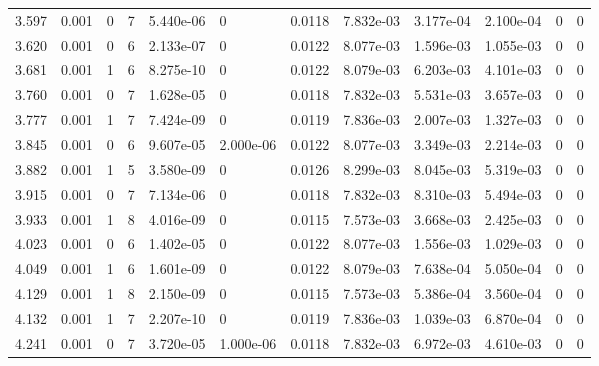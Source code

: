 \documentclass[preview]{standalone}
\begin{document}
{{{\begin{tabular}{L{1.2cm}C{1.2cm} C{0.3cm}C{0.5cm} C{1.4cm}C{1.4cm} C{1.4cm}C{1.4cm} C{1.6cm}C{1.6cm} C{1.6cm}C{1.6cm}}
  3.597  &  0.001  & 0     &  7 &  5.440e-06  & 0  &  0.0118&   7.832e-03& 3.177e-04 & 2.100e-04   &  0 & 0  \\ 
  3.620  &  0.001  & 0     &  6 &  2.133e-07  & 0  &  0.0122&   8.077e-03& 1.596e-03 & 1.055e-03   &  0 & 0  \\ 
  3.681  &  0.001  & 1     &  6 &  8.275e-10  & 0  &  0.0122&   8.079e-03& 6.203e-03 & 4.101e-03   &  0 & 0  \\ 
  3.760  &  0.001  & 0     &  7 &  1.628e-05  & 0  &  0.0118&   7.832e-03& 5.531e-03 & 3.657e-03   &  0 & 0  \\ 
  3.777  &  0.001  & 1     &  7 &  7.424e-09  & 0  &  0.0119&   7.836e-03& 2.007e-03 & 1.327e-03   &  0 & 0  \\ 
  3.845  &  0.001  & 0     &  6 &  9.607e-05  & 2.000e-06  &  0.0122&   8.077e-03& 3.349e-03 & 2.214e-03   &  0 & 0  \\ 
  3.882  &  0.001  & 1     &  5 &  3.580e-09  & 0  &  0.0126&   8.299e-03& 8.045e-03 & 5.319e-03   &  0 & 0  \\ 
  3.915  &  0.001  & 0     &  7 &  7.134e-06  & 0  &  0.0118&   7.832e-03& 8.310e-03 & 5.494e-03   &  0 & 0  \\ 
  3.933  &  0.001  & 1     &  8 &  4.016e-09  & 0  &  0.0115&   7.573e-03& 3.668e-03 & 2.425e-03   &  0 & 0  \\ 
  4.023  &  0.001  & 0     &  6 &  1.402e-05  & 0  &  0.0122&   8.077e-03& 1.556e-03 & 1.029e-03   &  0 & 0  \\ 
  4.049  &  0.001  & 1     &  6 &  1.601e-09  & 0  &  0.0122&   8.079e-03& 7.638e-04 & 5.050e-04   &  0 & 0  \\ 
  4.129  &  0.001  & 1     &  8 &  2.150e-09  & 0  &  0.0115&   7.573e-03& 5.386e-04 & 3.560e-04   &  0 & 0  \\ 
  4.132  &  0.001  & 1     &  7 &  2.207e-10  & 0  &  0.0119&   7.836e-03& 1.039e-03 & 6.870e-04   &  0 & 0  \\ 
  4.241  &  0.001  & 0     &  7 &  3.720e-05  & 1.000e-06  &  0.0118&   7.832e-03& 6.972e-03 & 4.610e-03   &  0 & 0  \\ 
\hline 
\end{tabular} 

}}}
\end{document}
